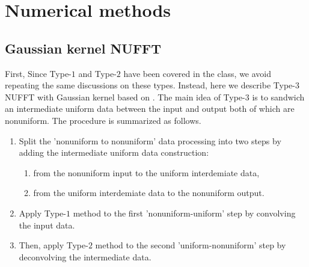 \section{Numerical methods}


\subsection{Gaussian kernel NUFFT}

First,
Since Type-$1$ and Type-$2$ have been covered in the class, we avoid repeating the same discussions on these types.
Instead, here we describe Type-$3$ NUFFT with Gaussian kernel based on \cite{JCP-2003-Greengard}.
The main idea of Type-$3$ is to sandwich an intermediate uniform data between the input and output both of which are nonuniform.
The procedure is summarized as follows.
\begin{enumerate}
  \item Split the 'nonuniform to nonuniform' data processing into two steps
  by adding the intermediate uniform data construction:
  \begin{enumerate}
    \item from the nonuniform input to the uniform interdemiate data,
    \item from the uniform interdemiate data to the nonuniform output.
  \end{enumerate}
  \item Apply Type-$1$ method to the first 'nonuniform-uniform' step by convolving the input data.
  \item Then, apply Type-$2$ method to the second 'uniform-nonuniform' step by deconvolving the intermediate data.
\end{enumerate}

